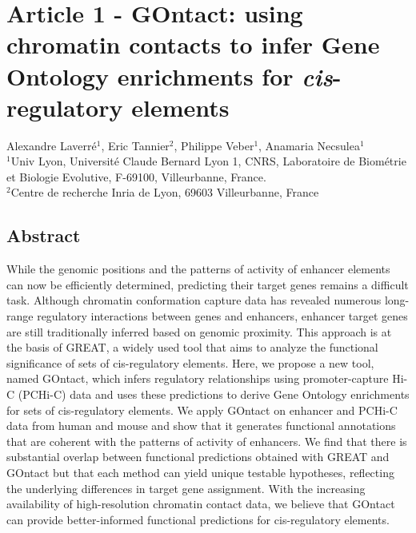 \chapter{Article 1 - GOntact: using chromatin contacts to infer Gene Ontology enrichments for \textit{cis}-regulatory elements}
\label{GOntact}

\begin{center}
    \large Alexandre Laverré$^{\text{1}}$, Eric Tannier$^{\text{2}}$, Philippe Veber$^{\text{1}}$, Anamaria Necsulea$^{\text{1}}$\\
    \vspace{0.5cm}
    \normalsize
    $^{\text{1}}$Univ Lyon, Université Claude Bernard Lyon 1, CNRS, Laboratoire de Biométrie et Biologie Evolutive, F-69100, Villeurbanne, France.\\
    $^{\text{2}}$Centre de recherche Inria de Lyon, 69603 Villeurbanne, France\\
\end{center}

{\hypersetup{linkcolor=GREYDARK}\minitoc}

\section{Abstract}
While the genomic positions and the patterns of activity of enhancer elements can now be efficiently determined, predicting their target genes remains a difficult task. Although chromatin conformation capture data has revealed numerous long-range regulatory interactions between genes and enhancers, enhancer target genes are still traditionally inferred based on genomic proximity. This approach is at the basis of GREAT, a widely used tool that aims to analyze the functional significance of sets of \acrshort{cis}-regulatory elements. Here, we propose a new tool, named GOntact, which infers regulatory relationships using promoter-capture Hi-C (PCHi-C) data and uses these predictions to derive Gene Ontology enrichments for sets of \acrshort{cis}-regulatory elements. We apply GOntact on enhancer and PCHi-C data from human and mouse and show that it generates functional annotations that are coherent with the patterns of activity of enhancers. We find that there is substantial overlap between functional predictions obtained with GREAT and GOntact but that each method can yield unique testable hypotheses, reflecting the underlying differences in target gene assignment. With the increasing availability of high-resolution chromatin contact data, we believe that GOntact can provide better-informed functional predictions for \acrshort{cis}-regulatory elements.

